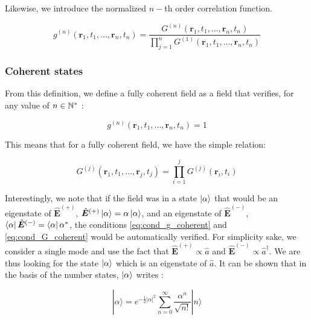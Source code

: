 Likewise, we introduce the normalized $n-$th order correlation function.

\begin{equation}
    g^{(n)}\left(\bm{r}_{1}, t_{1}, ...,  \bm{r}_{n}, t_{n}\right)=\frac{G^{(n)}\left(\bm{r}_{1}, t_{1}, ...,  \bm{r}_{n}, t_{n}\right)}{\displaystyle \prod_{j=1}^{n} G^{(1)}\left(\bm{r}_{1}, t_{1}, ..., \bm{r}_{n}, t_{n}\right)}
\end{equation}

\subsubsection{Coherent states}

\noindent From this definition, we define a fully coherent field as a field that verifies, for any value of $n \in \mathbb{N}^*$ \cite{glauber1963quantum}:

\begin{equation}
    g^{(n)}\left(\bm{r}_{1}, t_{1}, ...,  \bm{r}_{n}, t_{n}\right)  = 1
    \label{eq:cond_g_coherent}
\end{equation}

\noindent This means that for a fully coherent field, we have the simple relation:

\begin{equation}
    G^{(j)}\left(\bm{r}_{1}, t_{1}, ... , \bm{r}_{j}, t_{j}\right) = \prod_{i=1}^{j} G^{(j)}(\bm{r}_{i}, t_{i})
    \label{eq:cond_G_coherent}
\end{equation}

Interestingly, we note that if the field was in a state $\ket{\alpha}$ that would be an eigenstate of $\hat{\bm{E}}^{(+)}$, $\hat{\bm{E}}^{(+)} \ket{\alpha} = \alpha \ket{\alpha}$, and an eigenstate of $\hat{\bm{E}}^{(-)}$, $\bra{\alpha} \hat{\bm{E}}^{(-)} = \bra{\alpha} \alpha^*$, the conditions \ref{eq:cond_g_coherent} and \ref{eq:cond_G_coherent} would be automatically verified. For simplicity sake, we consider a single mode and use the fact that $\hat{\bm{E}}^{(+)} \propto \hat{a}$ and $\hat{\bm{E}}^{(-)} \propto \hat{a}^{\dagger}$. We are thus looking for the state $\ket{\alpha}$ which is an eigenstate of $\hat{a}$. It can be shown that in the basis of the number states, $\ket{\alpha}$ writes \cite{glauber1963coherent}:

\begin{equation}
    |\alpha\rangle=e^{-\frac{1}{2}|\alpha|^{2}} \sum_{n=0}^{\infty} \frac{\alpha^{n}}{\sqrt{n !}}|n\rangle
    \label{eq:coherent_state}
\end{equation}

